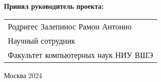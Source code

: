\begin{titlepage}
    \vspace{1em}
    {\bf Принял руководитель проекта: \vspace{2mm}}
    
    {
    \begin{tabular}{l}
    Родригес Залепинос Рамон Антонио\\
    Научный сотрудник\\
    Факультет компьютерных наук НИУ ВШЭ 
    \end{tabular}}
    
    
    
    
    
    \vspace{\fill}
    
    \begin{center}
    Москва 2024
    \end{center}
    
    \end{titlepage}